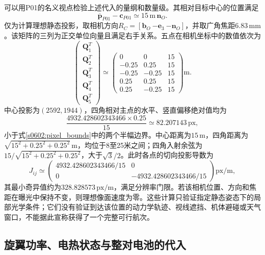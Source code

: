 可以用P01的名义视点检验上述代入的量纲和数量级。其相对目标中心的位置满足
\begin{equation}
 \overline{\mathbf p}_{P01}-\mathbf c_{P01}
 \simeq15\,\mathrm m\,\mathbf n_O.
 \label{s0602:nominal_distance}
\end{equation}
仅为计算理想静态投影，取相机方向$R_C=[\mathbf b_O\ {-\mathbf e_3}\ {-\mathbf n_O}]$，并取广角焦距$6.83\,\mathrm{mm}$。该矩阵的三列为正交单位向量且满足右手关系。五点在相机坐标中的数值依次为
\begin{equation}
 \begin{pmatrix}
 \mathbf Q_1^T\\\mathbf Q_2^T\\\mathbf Q_3^T\\\mathbf Q_4^T\\\mathbf Q_5^T
 \end{pmatrix}
 \simeq
 \begin{pmatrix}
 0&0&15\\
 -0.25&0.25&15\\
 -0.25&-0.25&15\\
 0.25&0.25&15\\
 0.25&-0.25&15
 \end{pmatrix}\mathrm m.
 \label{s0602:nominal_camera_points}
\end{equation}
中心投影为$(2592,1944)$，四角相对主点的水平、竖直偏移绝对值均为
\begin{equation}
 \frac{4932.428602343466\times0.25}{15}
 \simeq82.207143\,\mathrm{px},
 \label{s0602:nominal_pixel_offset}
\end{equation}
小于式\eqref{s0602:pixel_bounds}中的两个半幅边界。中心距离为$15\,\mathrm m$，四角距离为$\sqrt{15^2+0.25^2+0.25^2}\,\mathrm m$，均位于8至25米之间；四角入射余弦为$15/\sqrt{15^2+0.25^2+0.25^2}$，大于$\sqrt3/2$。此时各点的切向投影导数为
\begin{equation}
 J_{ij}\simeq
 \begin{pmatrix}
 4932.428602343466/15&0\\
 0&-4932.428602343466/15
 \end{pmatrix}\mathrm{px/m},
 \label{s0602:nominal_scale}
\end{equation}
其最小奇异值约为$328.828573\,\mathrm{px/m}$，满足分辨率门限。若该相机位置、方向和焦距在曝光中保持不变，则理想像面速度为零。这些计算只验证指定静态姿态下的局部光学条件；它们没有验证到达该位置的动力学轨迹、视线遮挡、机体避碰或天气窗口，不能据此宣称获得了一个完整可行航次。

\subsection{旋翼功率、电热状态与整对电池的代入}

